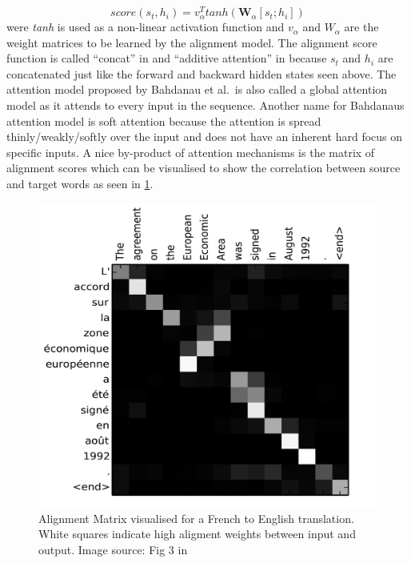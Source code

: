 \documentclass[]{krantz}
\begin{document}
\[
score(s_t,h_i) = v_\alpha^Ttanh(\mathbf{W}_\alpha[s_t;h_i])
\]
were \emph{tanh} is used as a non-linear activation function and \(v_\alpha\) and \(W_\alpha\)
are the weight matrices to be learned by the alignment model. The alignment score function
is called ``concat'' in \citet{luong2015effective} and ``additive attention'' in \citet{vaswani2017attention}
because \(s_t\) and \(h_i\) are concatenated just like the forward and backward hidden states seen above.
The attention model proposed by Bahdanau et al.~is also called a global attention model as it attends
to every input in the sequence. Another name for Bahdanaus attention model is soft attention
because the attention is spread thinly/weakly/softly over the input and does not have an inherent hard focus on specific inputs.
A nice by-product of attention mechanisms is the matrix of alignment scores
which can be visualised to show the correlation between source and target words as seen in \ref{fig:attention-plot-bahdanau}.

\begin{figure}

{\centering \includegraphics[width=\textwidth,height=0.3\textheight]{./figures/02-02-attention-and-self-attention-for-nlp/bahdanau-fig3} 

}

\caption{Alignment Matrix visualised for a French to English translation. White squares indicate high aligment weights between input and output. Image source: Fig 3 in \citep{bahdanau2014neural}}\label{fig:attention-plot-bahdanau}
\end{figure}
\end{document}
